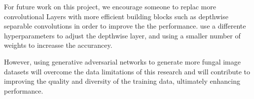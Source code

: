 For future work on this project, we encourage someone to replac more convolutional Layers with more efficient building blocks such as depthwise separable convolutions in order to improve the the performance. use a differente hyperparameters to adjust the depthwise layer, and using a smaller number of  weights to increasse the accurancey.

However, using generative adversarial networks to generate more fungal image datasets will overcome the data limitations of this research and will contribute to improving the quality and diversity of the training data, ultimately enhancing performance.




